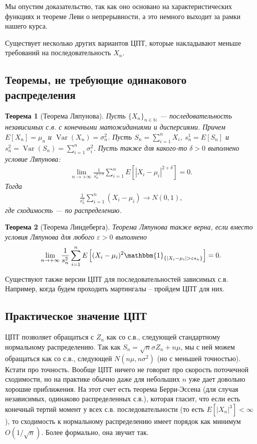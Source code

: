 \documentclass[12pt]{article}
\newcommand\N{\mathbb{N}}
\newcommand\eps{\varepsilon}
\newcommand\one{\mathbbm{1}}
\DeclareMathOperator{\Var}{Var}
\newtheorem{theorem}{Теорема}
\begin{document}
Мы опустим доказательство, так как оно основано на характеристических функциях и теореме Леви о непрерывности, а это немного выходит за рамки нашего курса. 

Существует несколько других вариантов ЦПТ, которые накладывают меньше требований на последовательность $X_n$. 


\subsection{Теоремы, не требующие одинакового распределения}
\begin{theorem}[Теорема Ляпунова]
  Пусть $\{X_n\}_{n \in \N}$ --- последовательность независимых с.в. с конечными матожиданиями и дисперсиями. Причем $E[X_n] = \mu_n$ и $\Var(X_n) = \sigma_n^2$. Пусть $S_n = \sum_{i = 1}^n X_i$, $s_n^1 = E[S_n]$ и $s_n^2 = \Var(S_n) = \sum_{i = 1}^n \sigma_i^2$. Пусть также для какого-то $\delta > 0$ выполнено условие Ляпунова:
  \begin{align*}
    \lim_{n \to +\infty} \frac{1}{s_n^{2 + \delta}} \sum_{i = 1}^n E\left[|X_i - \mu_i|^{2 + \delta}\right] = 0.
  \end{align*}
  Тогда
  \begin{align*}
    \frac{1}{s_n^1} \sum_{i = 1}^n (X_i - \mu_i) \to N(0, 1),
  \end{align*} 
  где сходимость --- по распределению.
\end{theorem}

\begin{theorem}[Теорема Линдеберга]
  Теорема Ляпунова также верна, если вместо условия Ляпунова для любого $\eps > 0$ выполнено
  \begin{align*}
    \lim_{n \to +\infty} \frac{1}{s_n^2} \sum_{i = 1}^n E\left[(X_i - \mu_i)^2 \one_{\{|X_i - \mu_i| > \eps s_n\}}\right] = 0.
  \end{align*}
\end{theorem}

Существуют также версии ЦПТ для последовательностей зависимых с.в. Например, когда будем проходить мартингалы -- пройдем ЦПТ для них.

\subsection{Практическое значение ЦПТ}

ЦПТ позволяет обращаться с $Z_n$ как со с.в., следующей стандартному нормальному распределению. Так как $S_n = \sqrt{n}\sigma Z_n + n\mu$, мы с ней можем обращаться как со с.в., следующей $N(n\mu, n\sigma^2)$ (но с меньшей точностью). Кстати про точность. Вообще ЦПТ ничего не говорит про скорость поточечной сходимости, но на практике обычно даже для небольших $n$ уже дает довольно хорошие приближения. На этот счет есть теорема Берри-Эссена (для случая независимых, одинаково распределенных с.в.), которая гласит, что если есть конечный тертий момент у всех с.в. последовательности (то есть $E[|X_n|^3] < \infty$), то сходимость к нормальному распределению имеет порядок как минимум $O(1/\sqrt{n})$. Более формально, она звучит так.
\end{document}
